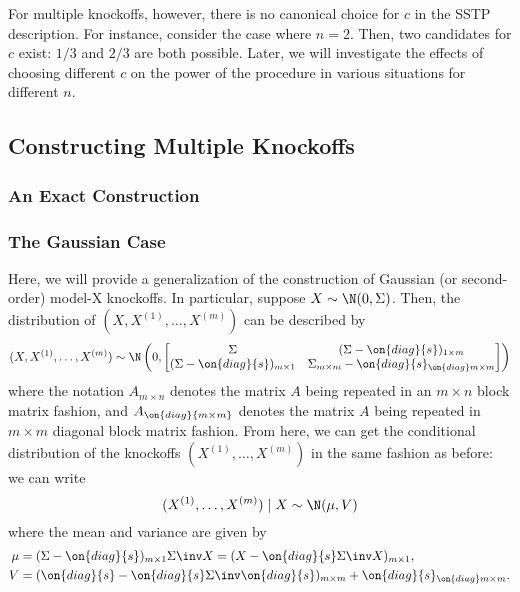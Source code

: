 \documentclass[11pt,reqno]{report}
\theoremstyle{definition}
\numberwithin{equation}{section}
\begin{document}
For multiple knockoffs, however, there is no canonical choice for $c$ in the SSTP description. For instance, consider the case where $n = 2$. Then, two candidates for $c$ exist: $1/3$ and $2/3$ are both possible. Later, we will investigate the effects of choosing different $c$ on the power of the procedure in various situations for different $n$.

\section{Constructing Multiple Knockoffs}
\subsection{An Exact Construction}


\subsection{The Gaussian Case}
Here, we will provide a generalization of the construction of Gaussian (or second-order) model-X knockoffs. In particular, suppose $X \sim \N(0, \Sigma)$. Then, the distribution of $(X, X^{(1)}, \ldots, X^{(m)})$ can be described by
\[ (X, X^{(1)}, \ldots, X^{(m)}) \sim \N\left( 0, \begin{bmatrix}
	\Sigma & (\Sigma - \on{diag}\{ s \})_{1 \times m} \\
	(\Sigma - \on{diag}\{ s \})_{m \times 1} & \Sigma_{m \times m} - \on{diag}\{ s \}_{\on{diag} m \times m}
\end{bmatrix}\right) \] where the notation $A_{m \times n}$ denotes the matrix $A$ being repeated in an $m \times n$ block matrix fashion, and $A_{\on{diag}{m \times m}}$ denotes the matrix $A$ being repeated in $m \times m$ diagonal block matrix fashion. From here, we can get the conditional distribution of the knockoffs $(X^{(1)}, \ldots, X^{(m)})$ in the same fashion as before: we can write
\[ (X^{(1)}, \ldots, X^{(m)}) \mid X \sim \N(\mu, V) \] where the mean and variance are given by
\begin{align*}
\mu &= (\Sigma - \on{diag}\{ s \})_{m \times 1} \Sigma\inv X = (X - \on{diag}\{s \} \Sigma\inv X)_{m \times 1}, \\
V &= (\on{diag}\{s\} - \on{diag}\{s\}\Sigma\inv \on{diag}\{s\})_{m \times m} + \on{diag}\{s\}_{\on{diag} m \times m}.
\end{align*}



\chapter{}



\end{document}
